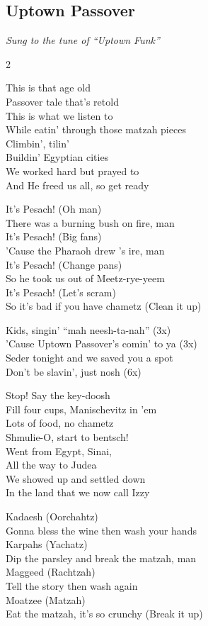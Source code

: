 \pagebreak
\subsection*{Uptown Passover}
\textit{Sung to the tune of ``Uptown Funk''}

\begin{multicols}{2}

This is that age old \\
Passover tale that's retold \\
This is what we listen to \\
While eatin' through those matzah pieces \\
Climbin', tilin' \\
Buildin' Egyptian cities \\
We worked hard but prayed to {\god} \\
And He freed us all, so get ready

It's Pesach! (Oh man) \\
There was a burning bush on fire, man \\
It's Pesach! (Big fans) \\
'Cause the Pharaoh drew {\god}'s ire, man \\
It's Pesach! (Change pans) \\
So he took us out of Meetz-rye-yeem \\
It's Pesach! (Let's scram) \\
So it's bad if you have chametz (Clean it up)

Kids, singin' ``mah neesh-ta-nah'' (3x) \\
'Cause Uptown Passover's comin' to ya (3x) \\
Seder tonight and we saved you a spot \\
Don't be slavin', just nosh (6x)

Stop! Say the key-doosh \\
Fill four cups, Manischevitz in 'em \\
Lots of food, no chametz \\
Shmulie-O, start to bentsch! \\
Went from Egypt, Sinai, \\
All the way to Judea \\
We showed up and settled down \\
In the land that we now call Izzy

Kadaesh (Oorchahtz) \\
Gonna bless the wine then wash your hands \\
Karpahs (Yachatz) \\
Dip the parsley and break the matzah, man \\
Maggeed (Rachtzah) \\
Tell the story then wash again \\
Moatzee (Matzah) \\
Eat the matzah, it's so crunchy (Break it up)


\end{multicols}
